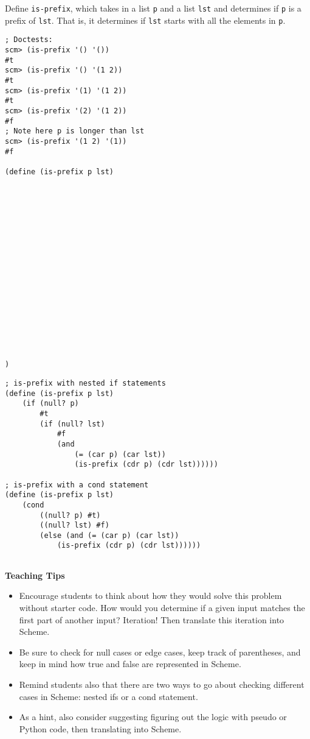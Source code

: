 \begin{blocksection}
\question Define \lstinline$is-prefix$, which takes in a list \lstinline$p$ and a list \lstinline$lst$ and determines 
if \lstinline$p$ is a prefix of \lstinline$lst$.
That is, it determines if \lstinline$lst$ starts with all the elements in \lstinline$p$.

\begin{lstlisting}
; Doctests:
scm> (is-prefix '() '())
#t
scm> (is-prefix '() '(1 2))
#t
scm> (is-prefix '(1) '(1 2))
#t
scm> (is-prefix '(2) '(1 2))
#f
; Note here p is longer than lst
scm> (is-prefix '(1 2) '(1))
#f

(define (is-prefix p lst)


















)
\end{lstlisting}
\end{blocksection}

\begin{blocksection}
\begin{solution}[.25in]
\begin{lstlisting}
; is-prefix with nested if statements
(define (is-prefix p lst)
    (if (null? p)
        #t
        (if (null? lst)
            #f
            (and
                (= (car p) (car lst))
                (is-prefix (cdr p) (cdr lst))))))

; is-prefix with a cond statement
(define (is-prefix p lst)
    (cond 
        ((null? p) #t)
        ((null? lst) #f)
        (else (and (= (car p) (car lst))
            (is-prefix (cdr p) (cdr lst))))))
 
\end{lstlisting}
\end{solution}
\end{blocksection}

\begin{blocksection}
\begin{guide}
\textbf{Teaching Tips}
\begin{itemize}
	\item Encourage students to think about how they would solve this problem without starter code. How would you determine if a given input matches the first part of another input? Iteration! Then translate this iteration into Scheme.
	\item Be sure to check for null cases or edge cases, keep track of parentheses, and keep in mind how true and false are represented in Scheme.
	\item Remind students also that there are two ways to go about checking different cases in Scheme: nested ifs or a cond statement.
	\item As a hint, also consider suggesting figuring out the logic with pseudo or Python code, then translating into Scheme.
\end{itemize}
\end{guide}
\end{blocksection}
